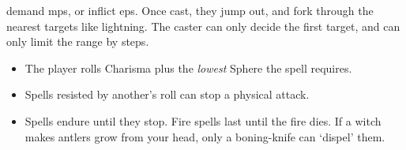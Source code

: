 demand \glspl{mp}, or inflict \glspl{ep}.
Once cast, they jump out, and fork through the nearest targets like lightning.
The caster can only decide the first target, and can only limit the range by \glspl{step}.

\begin{itemize}
  \item
  The player rolls Charisma plus the \emph{lowest} Sphere the spell requires.
  \item
  Spells resisted by another's roll can stop a physical attack.
  \item
  Spells endure until they stop.
  Fire spells last until the fire dies.
  If a witch makes antlers grow from your head, only a boning-knife can `dispel' them.
\end{itemize}
